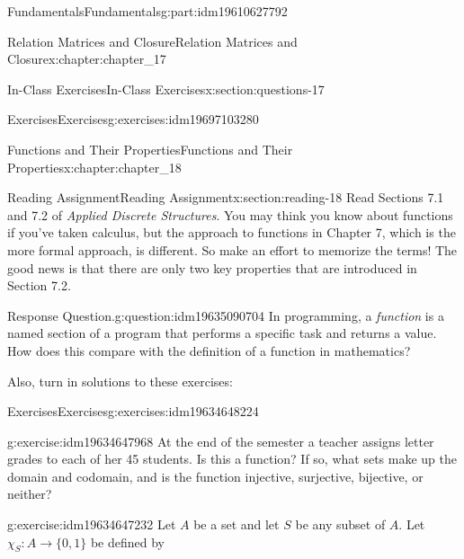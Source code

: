 \documentclass[oneside,10pt,]{book}
\numberwithin{equation}{section}
\begin{document}
\begin{partptx}{Fundamentals}{}{Fundamentals}{}{}{g:part:idm19610627792}
\begin{chapterptx}{Relation Matrices and Closure}{}{Relation Matrices and Closure}{}{}{x:chapter:chapter_17}
\begin{sectionptx}{In-Class Exercises}{}{In-Class Exercises}{}{}{x:section:questions-17}
\begin{exercises-subsection-numberless}{Exercises}{}{Exercises}{}{}{g:exercises:idm19697103280}
\par\medskip\noindent
\end{exercises-subsection-numberless}
\end{sectionptx}
\end{chapterptx}
%
\typeout{************************************************}
\typeout{************************************************}
%
\begin{chapterptx}{Functions and Their Properties}{}{Functions and Their Properties}{}{}{x:chapter:chapter_18}
%
%
%
\typeout{************************************************}
\typeout{************************************************}
%
\begin{sectionptx}{Reading Assignment}{}{Reading Assignment}{}{}{x:section:reading-18}
Read Sections 7.1 and 7.2 of \emph{Applied Discrete Structures}.  You may think you know about functions if you've taken calculus, but the approach to functions in Chapter 7, which is the more formal approach, is different. So make an effort to memorize the terms!  The good news is that there are only two key properties that are introduced in Section 7.2.%
\begin{question}{Response Question.}{g:question:idm19635090704}%
In programming, a \emph{function} is a named section of a program that performs a specific task and returns a value.  How does this compare with the definition of a function in mathematics?%
\end{question}
Also, turn in solutions to these exercises:%
%
%
\typeout{************************************************}
\typeout{************************************************}
%
\begin{exercises-subsection-numberless}{Exercises}{}{Exercises}{}{}{g:exercises:idm19634648224}
\par\medskip\noindent%
%
\begin{exercisegroup}
\begin{divisionexerciseeg}{1}{}{}{g:exercise:idm19634647968}%
At the end of the semester a teacher assigns letter grades to each of her 45 students. Is this a function? If so, what sets make up the domain and codomain, and is the function injective, surjective, bijective, or neither?%
\end{divisionexerciseeg}%
\begin{divisionexerciseeg}{2}{}{}{g:exercise:idm19634647232}%
Let \(A\) be a set and let \(S\) be any subset of \(A\). Let \(\chi_S: A\to \{0,1\}\) be defined by%

\end{divisionexerciseeg}
\end{exercisegroup}
\end{exercises-subsection-numberless}
\end{sectionptx}
\end{chapterptx}
\end{partptx}
\end{document}
